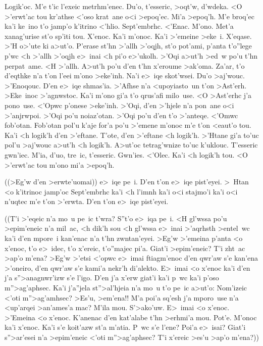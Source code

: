 {{Logik'oc. M'e t'ic l'exeic metrhm'enec. Du'o, t'esseric, >oqt'w, d'wdeka. <O
>'erwt'ac tou kr'athse <'oso krat~ane o<i >epoq'ec. Mi'a >epoq'h. M'e broq'ec
ka'i ke~ino t'o jamp'o k'itrino <'hlio. Sept'embrhc. <'Enac. M'ono. Met'a
xanag'urise st'o sp'iti tou. X'enoc. Ka'i m'onoc. Ka'i >'emeine >eke~i.
X'eqase. >'H o>'ute ki a>ut'o. P'erase st'hn >'allh >'oqjh, st'o pot'ami,
p'anta t'o''lege p'wc <h >'allh >'oqjh e>~inai <h pi'o e>'ukolh. >'Oqi a>ut'h
>ed~w po'u t'hn perpat~ame. <H >'allh. A>ut'h po'u d'en t'hn x'eroume >ak'oma.
Za'ar, t'o d'eqthke n'a t'on l'eei m'ono >eke'inh. Na'i e>~iqe skot'wsei. Du'o
>aj'wouc. >'Enoqouc. D'en e>~iqe shmas'ia. >'Afhse n'a <upoyiasto~un t'on
>Ast'erh. >Eke~inoc >'agnwstoc. Ka'i m'ono gi'a t'o qrus'afi milo~use. <O
>Ast'erhc j'a pono~use. <'Opwc p'onese >eke'inh. >'Oqi, d'en >'hjele n'a
pon~ane o<i >'anjrwpoi. >'Oqi po'u noiaz'otan. >'Oqi po'u d'en t'o >'anteqe.
<'Omwc fob'otan. Fob'otan pol'u k'aje for'a po'u >'emene m'onoc m'e t'on
<eaut'o tou. Ka'i <h logik'h d'en >'eftane. T'ote, d'en >'eftane <h logik'h.
>'Htane gi'a to'uc pol'u >aj'wouc a>ut'h <h logik'h. A>ut'oc tetrag'wnize to'uc
k'uklouc. T'esseric gwn'iec. M'ia, d'uo, tre~ic, t'esseric. Gwn'ies. <'Olec.
Ka'i <h logik'h tou. <O >'erwt'ac tou m'ono mi'a >epoq'h.
 
((>Eg'w d'en >erwte'uomai)) e>~iqe pe~i. D'en t'on e>~iqe pist'eyei. >~Htan <o
k'itrinoc jamp'oc Sept'embrhc ka'i <h l'imnh ka'i o<i stajmo'i ka'i o<i n'uqtec
m'e t'on >'erwta. D'en t'on e>~iqe pist'eyei.
 
((T'i >'eqeic n'a mo~u pe~ic t'wra? S''t'o e>~iqa pe~i. <H gl'wssa po'u
>epim'eneic n'a mil~ac, <h dik'h sou <h gl'wssa e>~inai >'aqrhsth >entel~wc
ka'i d'en mpore~i kan'enac n'a t'hn zwntan'eyei. >Eg'w >'emeina p'anta <o
x'enoc, t'o e>~idec, t'o x'ereic, t'o''majec pi'a. Giat'i >epim'eneic? T'i
zht~ac >ap'o m'ena? >Eg'w >'etsi <'opwc e>~imai ftiagm'enoc d'en qwr'aw s'e
kan'ena >'oneiro, d'en qwr'aw s'e kami'a nekr'h di'alekto. E>~imai <o x'enoc
ka'i d'en j'a s''>anagnwr'izw s'e l'igo. D'en j'a x'erw giat'i ka'i p~wc ka'i
p'oso m''>ag'aphsec. Ka'i j'a''jela st''>al'hjeia n'a mo~u t'o pe~ic a>ut'o:
Nom'izeic <'oti m''>ag'amhsec? >Es'u, >em'ena!! M'a poi'a sq'esh j'a mporo~use
n'a <up'arqei >an'ames'a mac? M'ila mou. S'>ako'uw. E>~imai <o x'enoc. >'Emeina
<o x'enoc. K'anenac d'en kat'alabe t'hn >erhmi'a mou. Pot'e. M'onoc ka'i
x'enoc. Ka'i s'e koit'azw st'a m'atia. P~wc s'e l'ene? Poi'a e>~isai? Giat'i
s''>ar'esei n'a >epim'eneic <'oti m''>ag'aphsec? T'i x'ereic >es'u >ap'o
m'ena?))}}
 
\def\sample{\names\table\text}
 
\init
 
